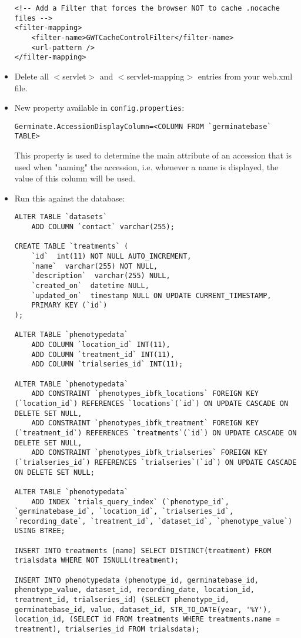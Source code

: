 \begin{itemize}
\begin{lstlisting}[style=Xml]
<!-- Add a Filter that forces the browser NOT to cache .nocache files -->
<filter-mapping>
	<filter-name>GWTCacheControlFilter</filter-name>
	<url-pattern />
</filter-mapping>
	\end{lstlisting}
	\item Delete all $<$servlet$>$ and $<$servlet-mapping$>$ entries from your web.xml file.
	\item New property available in \texttt{config.properties}:
	\begin{lstlisting}[style=Properties]
Germinate.AccessionDisplayColumn=<COLUMN FROM `germinatebase` TABLE>
	\end{lstlisting}
	This property is used to determine the main attribute of an accession that is used when "naming" the accession, i.e. whenever a name is displayed, the value of this column will be used.
	\item Run this against the database:
	\begin{lstlisting}[style=SQL]
ALTER TABLE `datasets`
	ADD COLUMN `contact` varchar(255);
	
CREATE TABLE `treatments` (
	`id`  int(11) NOT NULL AUTO_INCREMENT,
	`name`  varchar(255) NOT NULL,
	`description`  varchar(255) NULL,
	`created_on`  datetime NULL,
	`updated_on`  timestamp NULL ON UPDATE CURRENT_TIMESTAMP,
	PRIMARY KEY (`id`)
);

ALTER TABLE `phenotypedata`
	ADD COLUMN `location_id` INT(11),
	ADD COLUMN `treatment_id` INT(11),
	ADD COLUMN `trialseries_id` INT(11);

ALTER TABLE `phenotypedata`
	ADD CONSTRAINT `phenotypes_ibfk_locations` FOREIGN KEY (`location_id`) REFERENCES `locations`(`id`) ON UPDATE CASCADE ON DELETE SET NULL,
	ADD CONSTRAINT `phenotypes_ibfk_treatment` FOREIGN KEY (`treatment_id`) REFERENCES `treatments`(`id`) ON UPDATE CASCADE ON DELETE SET NULL,
	ADD CONSTRAINT `phenotypes_ibfk_trialseries` FOREIGN KEY (`trialseries_id`) REFERENCES `trialseries`(`id`) ON UPDATE CASCADE ON DELETE SET NULL;

ALTER TABLE `phenotypedata`
	ADD INDEX `trials_query_index` (`phenotype_id`, `germinatebase_id`, `location_id`, `trialseries_id`, `recording_date`, `treatment_id`, `dataset_id`, `phenotype_value`) USING BTREE;

INSERT INTO treatments (name) SELECT DISTINCT(treatment) FROM trialsdata WHERE NOT ISNULL(treatment);

INSERT INTO phenotypedata (phenotype_id, germinatebase_id, phenotype_value, dataset_id, recording_date, location_id, treatment_id, trialseries_id) (SELECT phenotype_id, germinatebase_id, value, dataset_id, STR_TO_DATE(year, '%Y'), location_id, (SELECT id FROM treatments WHERE treatments.name = treatment), trialseries_id FROM trialsdata);


\end{lstlisting}
\end{itemize}

